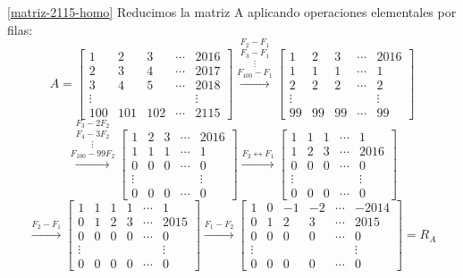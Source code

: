 \begin{enumerate}[topsep=6pt, itemsep=.4cm]
\ref{matriz-2115-homo} Reducimos la matriz A aplicando operaciones elementales por filas:
\begin{equation*}
    A = \begin{bmatrix}1 & 2 & 3 & \cdots & 2016 \\ 2 & 3 & 4 & \cdots & 2017 \\ 3&4&5& \cdots & 2018\\ \vdots & &&& \vdots \\ 100 & 101 & 102& \cdots& 2115\end{bmatrix} \stackrel{F_2-F_1}{\stackrel{F_3 - F_1}{\stackrel{\vdots}{\stackrel{F_{100}-F_1}{\longrightarrow}}}}
    \begin{bmatrix}1 & 2 & 3 & \cdots & 2016 \\ 1 & 1 & 1 & \cdots & 1 \\ 2&2&2& \cdots & 2\\ \vdots & &&& \vdots \\ 99 & 99 & 99& \cdots& 99\end{bmatrix}
\end{equation*}
\begin{equation*}
    \stackrel{F_3-2F_2}{\stackrel{F_4-3F_2}{\stackrel{\vdots}{\stackrel{F_{100}-99F_2}{\longrightarrow}}}} 
    \begin{bmatrix}1 & 2 & 3 & \cdots & 2016 \\ 1 & 1 & 1 & \cdots & 1 \\ 0&0&0& \cdots & 0\\ \vdots & &&& \vdots \\ 0 & 0 & 0& \cdots& 0\end{bmatrix}
    \stackrel{F_2 \leftrightarrow F_1}{\longrightarrow}
    \begin{bmatrix}1 & 1 & 1 & \cdots & 1 \\ 1 & 2 & 3 & \cdots & 2016 \\ 0&0&0& \cdots & 0\\ \vdots & &&& \vdots \\ 0 & 0 & 0& \cdots& 0\end{bmatrix}
\end{equation*}
\begin{equation*}
    \stackrel{F_2-F_1}{\longrightarrow}
    \begin{bmatrix}1 & 1 & 1 & 1 & \cdots & 1 \\ 0 & 1 & 2 & 3 & \cdots & 2015 \\ 0&0&0&0& \cdots & 0\\ \vdots & &&&& \vdots \\ 0 & 0 & 0&0& \cdots& 0\end{bmatrix}
    \stackrel{F_1-F_2}{\longrightarrow} 
    \begin{bmatrix}1 & 0 & -1 & -2 & \cdots & -2014 \\ 0 & 1 & 2 & 3 & \cdots & 2015 \\ 0&0&0&0& \cdots & 0\\ \vdots & &&&& \vdots \\ 0 & 0 & 0&0& \cdots& 0\end{bmatrix} = R_A
\end{equation*}


\end{enumerate}
